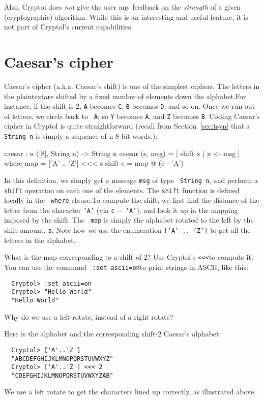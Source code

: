 Also, Cryptol does \emph{not} give the user any feedback on the
\emph{strength} of a given (cryptographic) algorithm.  While this is
an interesting and useful feature, it is not part of Cryptol's current
capabilities.

\section{Caesar's cipher}
\label{sec:caesar}

Caesar's cipher (a.k.a. Caesar's shift) is one of the simplest
ciphers.  The letters in the plaintext\indPlaintext are shifted by a
fixed number of elements down the alphabet.\indCaesarscipher For
instance, if the shift is 2, {\tt A} becomes {\tt C}, {\tt B} becomes
{\tt D}, and so on. Once we run out of letters, we circle back to {\tt
  A}; so {\tt Y} becomes {\tt A}, and {\tt Z} becomes {\tt B}.  Coding
Caesar's cipher in Cryptol is quite straightforward (recall from
Section~\ref{sec:tsyn} that a {\tt String n} is simply a sequence of n
8-bit words.):\indTSString
\begin{code}
  caesar : {n} ([8], String n) -> String n
  caesar (s, msg) = [ shift x | x <- msg ]
        where map     = ['A' .. 'Z'] <<< s
              shift c = map @ (c - 'A')
\end{code}
In this definition, we simply get a message {\tt msg} of type {\tt
  String n}, and perform a {\tt shift} operation on each one of the
elements.  The {\tt shift} function is defined locally in the {\tt
  where}-clause.\indWhere To compute the shift, we first find the
distance of the letter from the character {\tt 'A'} (via {\tt c -
  'A'}), and look it up in the mapping imposed by the shift. The {\tt
  map} is simply the alphabet rotated to the left by the shift amount,
{\tt s}. Note how we use the enumeration {\tt ['A' .. 'Z']} to get all
the letters in the alphabet.\indEnum

\begin{Exercise}\label{ex:caesar:0}
  What is the map corresponding to a shift of 2? Use Cryptol's
  \verb+<<<+\indRotLeft to compute it.  You can use the command {\tt
    :set ascii=on}\indSettingASCII to print strings in ASCII, like
  this:
\begin{Verbatim}
  Cryptol> :set ascii=on
  Cryptol> "Hello World"
  "Hello World"
\end{Verbatim}
Why do we use a left-rotate, instead of a right-rotate?
\end{Exercise}
\begin{Answer}
Here is the alphabet and the corresponding shift-2 Caesar's alphabet:
\begin{verbatim}
  Cryptol> ['A'..'Z'] 
  "ABCDEFGHIJKLMNOPQRSTUVWXYZ"
  Cryptol> ['A'..'Z'] <<< 2
  "CDEFGHIJKLMNOPQRSTUVWXYZAB"
\end{verbatim}
We use a left rotate to get the characters lined up correctly, as
illustrated above.  \indRotLeft\indRotRight
\end{Answer}

